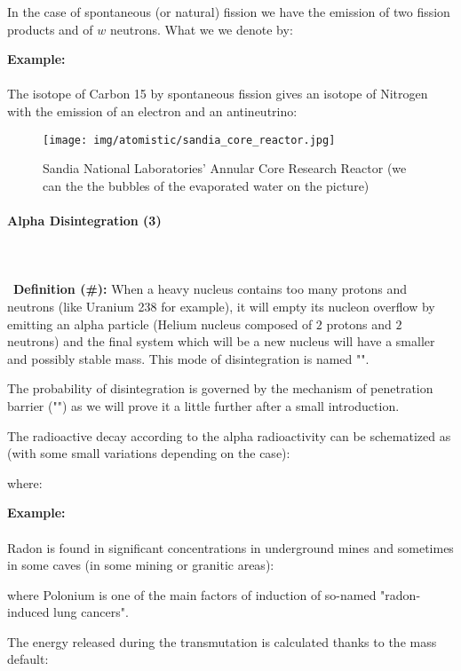 	In the case of spontaneous (or natural) fission we have the emission of two fission products and of $w$ neutrons. What we we denote by:
	
	\begin{tcolorbox}[colframe=black,colback=white,sharp corners]
	\textbf{{\Large {}}Example:}\\\\
	The isotope of Carbon 15 by spontaneous fission gives an isotope of Nitrogen with the emission of an electron and an antineutrino:
	
	\end{tcolorbox}
	\begin{figure}[H]
		\centering
		\texttt{[image: img/atomistic/sandia\_core\_reactor.jpg]}
		\caption[]{Sandia National Laboratories' Annular Core Research Reactor (we can the the bubbles of the evaporated water on the picture)}
	\end{figure}
	
	\paragraph{Alpha Disintegration (3)}\mbox{}\\\\\
	\textbf{Definition (\#\mydef):} When a heavy nucleus contains too many protons and neutrons (like Uranium 238 for example), it will empty its nucleon overflow by emitting an alpha particle (Helium nucleus composed of $2$ protons and $2$ neutrons) and the final system which will be a new nucleus will have a smaller and possibly stable mass. This mode of disintegration is named "".
	
	The probability of disintegration is governed by the mechanism of penetration barrier ("") as we will prove it a little further after a small introduction.

	The radioactive decay according to the alpha radioactivity can be schematized as (with some small variations depending on the case):
	
	where:
	
	\begin{tcolorbox}[colframe=black,colback=white,sharp corners]
	\textbf{{\Large {}}Example:}\\\\
	Radon is found in significant concentrations in underground mines and sometimes in some caves (in some mining or granitic areas):
	
	where Polonium is one of the main factors of induction of so-named "radon-induced lung cancers".
	\end{tcolorbox}
	The energy released during the transmutation is calculated thanks to the mass default:
	
